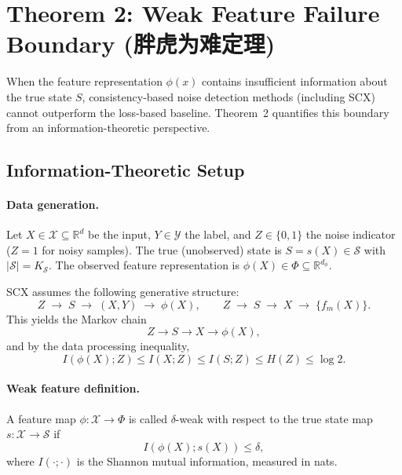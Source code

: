 
\section{Theorem 2: Weak Feature Failure Boundary (胖虎为难定理)}
\label{sec:thm2}

When the feature representation $\phi(x)$ contains insufficient information
about the true state $S$, consistency-based noise detection methods
(including SCX) cannot outperform the loss-based baseline. Theorem~2
quantifies this boundary from an information-theoretic perspective.

\subsection{Information-Theoretic Setup}
\label{sec:thm2:setup}

\paragraph{Data generation.}
Let $X \in \mathcal{X} \subseteq \mathbb{R}^d$ be the input, $Y \in \mathcal{Y}$
the label, and $Z \in \{0,1\}$ the noise indicator ($Z=1$ for noisy samples).
The true (unobserved) state is $S = s(X) \in \mathcal{S}$ with
$|\mathcal{S}| = K_{\mathcal{S}}$. The observed feature representation is
$\phi(X) \in \Phi \subseteq \mathbb{R}^{d_\phi}$.

SCX assumes the following generative structure:
\[
Z \;\to\; S \;\to\; (X, Y) \;\to\; \phi(X),
\qquad
Z \;\to\; S \;\to\; X \;\to\; \{f_m(X)\}.
\]
This yields the Markov chain
\begin{equation}
Z \to S \to X \to \phi(X),
\label{eq:markov-chain}
\end{equation}
and by the data processing inequality,
\[
I(\phi(X); Z) \leq I(X; Z) \leq I(S; Z) \leq H(Z) \leq \log 2.
\]

\paragraph{Weak feature definition.}

\begin{definition}
\label{def:weak-feature}
A feature map $\phi: \mathcal{X} \to \Phi$ is called $\delta$-weak with respect
to the true state map $s: \mathcal{X} \to \mathcal{S}$ if
\begin{equation}
I(\phi(X); s(X)) \leq \delta,
\label{eq:weak-feature}
\end{equation}
where $I(\cdot;\cdot)$ is the Shannon mutual information, measured in nats.
\end{definition}

